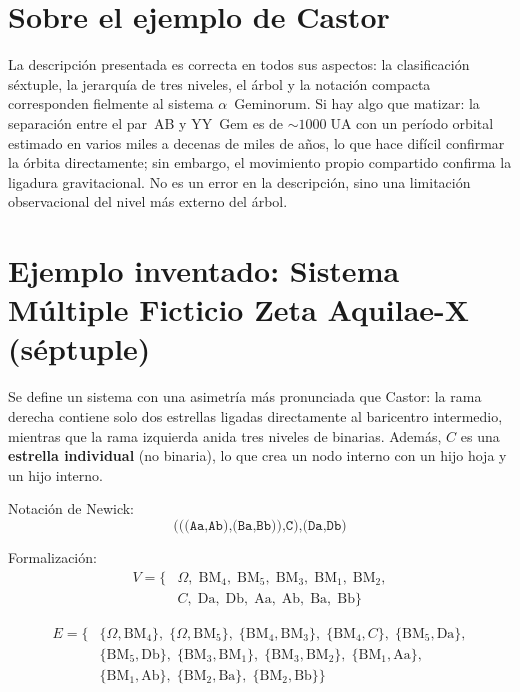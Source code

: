 \documentclass[a4paper]{article}
\begin{document}
\section{Sobre el ejemplo de Castor}

La descripción presentada es correcta en todos sus aspectos: la
clasificación séxtuple, la jerarquía de tres niveles, el árbol
y la notación compacta corresponden fielmente al sistema
$\alpha$~Geminorum. Si hay algo que matizar: la separación entre el
par~AB y YY~Gem es de $\sim 1000\;\mathrm{UA}$ con un período
orbital estimado en varios miles a decenas de miles de años, lo que
hace difícil confirmar la órbita directamente; sin embargo, el
movimiento propio compartido confirma la ligadura gravitacional. No es
un error en la descripción, sino una limitación observacional del
nivel más externo del árbol.

\section{Ejemplo inventado: Sistema Múltiple Ficticio Zeta Aquilae-X
         (séptuple)}

Se define un sistema con una asimetría más pronunciada que Castor:
la rama derecha contiene solo dos estrellas ligadas directamente al
baricentro intermedio, mientras que la rama izquierda anida tres
niveles de binarias. Además, $C$ es una \textbf{estrella individual}
(no binaria), lo que crea un nodo interno con un hijo hoja y un hijo
interno.

Notación de Newick:
$$\texttt{(((Aa,Ab),(Ba,Bb)),C),(Da,Db)}$$

Formalización:
\begin{align*}
V = \bigl\{&\Omega,\;\mathrm{BM_4},\;\mathrm{BM_5},\;\mathrm{BM_3},\;
             \mathrm{BM_1},\;\mathrm{BM_2},\\
           &C,\;\mathrm{Da},\;\mathrm{Db},\;
            \mathrm{Aa},\;\mathrm{Ab},\;\mathrm{Ba},\;\mathrm{Bb}
    \bigr\}
\end{align*}

\begin{align*}
E = \bigl\{
  &\{\Omega, \mathrm{BM_4}\},\;
   \{\Omega, \mathrm{BM_5}\},\;
   \{\mathrm{BM_4}, \mathrm{BM_3}\},\;
   \{\mathrm{BM_4}, C\},\;
   \{\mathrm{BM_5}, \mathrm{Da}\},\\
  &\{\mathrm{BM_5}, \mathrm{Db}\},\;
   \{\mathrm{BM_3}, \mathrm{BM_1}\},\;
   \{\mathrm{BM_3}, \mathrm{BM_2}\},\;
   \{\mathrm{BM_1}, \mathrm{Aa}\},\\
  &\{\mathrm{BM_1}, \mathrm{Ab}\},\;
   \{\mathrm{BM_2}, \mathrm{Ba}\},\;
   \{\mathrm{BM_2}, \mathrm{Bb}\}
\bigr\}
\end{align*}
\end{document}
